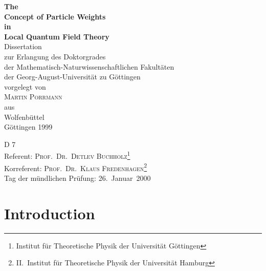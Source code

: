 \documentclass[11pt,twoside,openright]{report}
\newcommand{\clearemptydoublepage}{\newpage{\pagestyle{empty}%
                                    \cleardoublepage}}
\theoremstyle{definition}
\theoremstyle{plain}
\theoremstyle{remark}
\theoremstyle{assumption}
\begin{document}
\begin{titlepage}
  \begin{center}
    \vspace*{\fill}
    {\Huge\bfseries The\\ Concept of Particle Weights\\ in\\
      Local Quantum Field Theory\\}
    \vfill
    \vfill
    \vfill
    Dissertation\\
    zur Erlangung des Doktorgrades\\
    der Mathematisch-Naturwissenschaftlichen Fakult\"{a}ten\\
    der Georg-August-Universit\"at zu G\"{o}ttingen\\
    \vspace{1cm}
    vorgelegt von\\
    \vspace{0.5cm}
    \textsc{Martin Porrmann}\\
    \vspace{0.5cm}
    aus\\
    Wolfenb\"{u}ttel\\
    \vspace{1cm}
    G\"{o}ttingen 1999\\
  \end{center}
\end{titlepage}


\thispagestyle{empty}
\vspace*{\fill}
\vfill
\noindent D 7\\
Referent: \textsc{Prof.~Dr.~Detlev Buchholz}\footnote{Institut
  f\"{u}r Theoretische Physik der Universit\"{a}t G\"{o}ttingen} \\
Korreferent: \textsc{Prof.~Dr.~Klaus
  Fredenhagen}\footnote{II.~Institut f\"{u}r Theoretische Physik
  der Universit\"{a}t Hamburg} \\
Tag der m\"{u}ndlichen Pr\"{u}fung: 26.~Januar~2000
\vfill

\clearemptydoublepage


\setcounter{page}{0}

\tableofcontents

\clearemptydoublepage





\chapter{Introduction}
  \label{chap-introduction}
\end{document}
